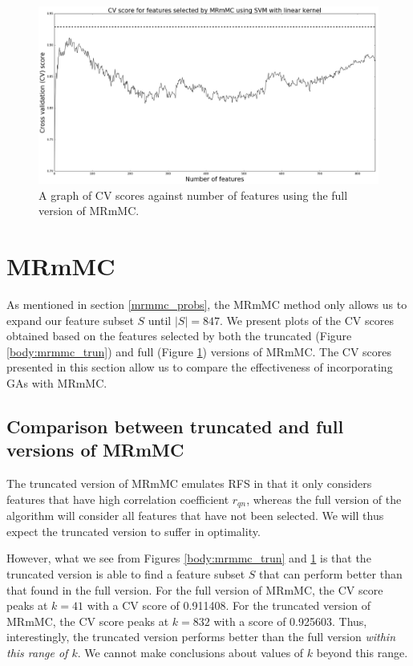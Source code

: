 \documentclass[12pt, twoside, a4paper]{report}
\begin{document}
\begin{figure}
\centering
\includegraphics[width=\textwidth]{images/mrmmc_linear_847.jpeg}
\caption{A graph of CV scores against number of features using the full version of MRmMC.}
\label{body:mrmmc:graph}
\end{figure}

\section{MRmMC}

As mentioned in section \ref{mrmmc_probs}, the MRmMC method only allows us to expand our feature subset $S$ until $|S|=847$. We present plots of the CV scores obtained based on the features selected by both the truncated (Figure \ref{body:mrmmc_trun}) and full (Figure \ref{body:mrmmc:graph}) versions of MRmMC. The CV scores presented in this section allow us to compare the effectiveness of incorporating GAs with MRmMC.

\subsection{Comparison between truncated and full versions of MRmMC}

The truncated version of MRmMC emulates RFS in that it only considers features that have high correlation coefficient $r_{qn}$, whereas the full version of the algorithm will consider all features that have not been selected. We will thus expect the truncated version to suffer in optimality.

However, what we see from Figures \ref{body:mrmmc_trun} and \ref{body:mrmmc:graph} is that the truncated version is able to find a feature subset $S$ that can perform better than that found in the full version. For the full version of MRmMC, the CV score peaks at $k=41$ with a CV score of 0.911408. For the truncated version of MRmMC, the CV score peaks at $k=832$ with a score of 0.925603. Thus, interestingly, the truncated version performs better than the full version \textit{within this range of $k$}. We cannot make conclusions about values of $k$ beyond this range.
\end{document}
